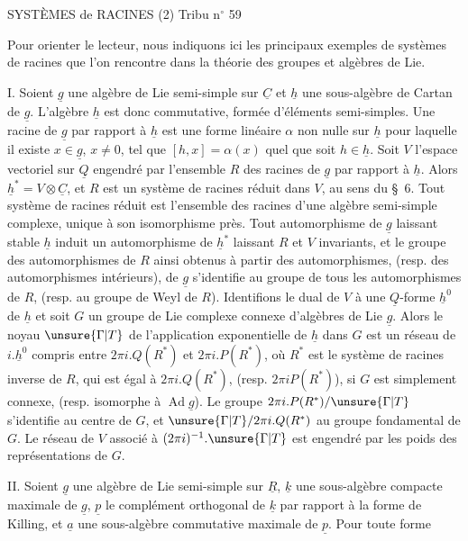 SYSTÈMES de RACINES (2) \hfill Tribu n$^\circ$ 59

Pour orienter le lecteur, nous indiquons ici les principaux exemples de systèmes de racines que l'on rencontre dans la théorie des groupes et algèbres de Lie.

I. Soient $\underline{g}$ une algèbre de Lie semi-simple sur $\underline{C}$ et $\underline{h}$ une sous-algèbre de Cartan de $\underline{g}$.
L'algèbre $\underline{h}$ est donc commutative, formée d'éléments semi-simples.
Une racine de $\underline{g}$ par rapport à $\underline{h}$ est une forme linéaire $\alpha$ non nulle sur $\underline{h}$ pour laquelle il existe $x\in\underline{g}$, $x\ne0$, tel que $[h,x]=\alpha(x)$ quel que soit $h\in\underline{h}$.
Soit $V$ l'espace vectoriel sur $\underline{Q}$ engendré par l'ensemble $R$ des racines de $\underline{g}$ par rapport à $\underline{h}$.
Alors $\underline{h}^*=V\otimes\underline{C}$, et $R$ est un système de racines réduit dans $V$, au sens du \S\ 6.
Tout système de racines réduit est l'ensemble des racines d'une algèbre semi-simple complexe, unique à son isomorphisme près.
Tout automorphisme de $\underline{g}$ laissant stable $\underline{h}$ induit un automorphisme de $\underline{h}^*$ laissant $R$ et $V$ invariants, et le groupe des automorphismes de $R$ ainsi obtenus à partir des automorphismes, (resp. des automorphismes intérieurs), de $\underline{g}$ s'identifie au groupe de tous les automorphismes de $R$, (resp. au groupe de Weyl de $R$).
Identifions le dual de $V$ à une $\underline{Q}$-forme $\underline{h}^0$ de $\underline{h}$ et soit $G$ un groupe de Lie complexe connexe d'algèbres de Lie $\underline{g}$.
Alors le noyau $\unsure{\Gamma|T}$ de l'application exponentielle de $\underline{h}$ dans $G$ est un réseau de $i.\underline{h}^0$ compris entre $2\pi i.Q(R^*)$ et $2\pi i.P(R^*)$, où $R^*$ est le système de racines inverse de $R$, qui est égal à $2\pi i.Q(R^*)$, (resp. $2\pi iP(R^*)$), si $G$ est simplement connexe, (resp. isomorphe à $\operatorname{Ad}\underline{g}$).
Le groupe $2\pi i.P(R^*)/\unsure{\Gamma|T}$ s'identifie au centre de $G$, et $\unsure{\Gamma|T}/2\pi i.Q(R^*)$ au groupe fondamental de $G$.
Le réseau de $V$ associé à $(2\pi i)^{-1}.\unsure{\Gamma|T}$ est engendré par les poids des représentations de $G$.

II. Soient $\underline{g}$ une algèbre de Lie semi-simple sur $\underline{R}$, $\underline{k}$ une sous-algèbre compacte maximale de $\underline{g}$, $\underline{p}$ le complément orthogonal de $\underline{k}$ par rapport à la forme de Killing, et $\underline{a}$ une sous-algèbre commutative maximale de $\underline{p}$. Pour toute forme

